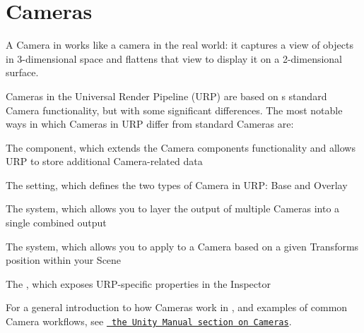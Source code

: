\chapter{Cameras}
\hypertarget{md__hey_tea_9_2_library_2_package_cache_2com_8unity_8render-pipelines_8universal_0d14_80_88_2_documentation_0i_2cameras}{}\label{md__hey_tea_9_2_library_2_package_cache_2com_8unity_8render-pipelines_8universal_0d14_80_88_2_documentation_0i_2cameras}
\label{md__hey_tea_9_2_library_2_package_cache_2com_8unity_8render-pipelines_8universal_0d14_80_88_2_documentation_0i_2cameras_autotoc_md2099}%
%
 A Camera in  works like a camera in the real world\+: it captures a view of objects in 3-\/dimensional space and flattens that view to display it on a 2-\/dimensional surface.

Cameras in the Universal Render Pipeline (URP) are based on \textquotesingle{}s standard Camera functionality, but with some significant differences. The most notable ways in which Cameras in URP differ from standard  Cameras are\+:


\begin{DoxyItemize}
\item The  component, which extends the Camera component\textquotesingle{}s functionality and allows URP to store additional Camera-\/related data
\item The  setting, which defines the two types of Camera in URP\+: Base and Overlay
\item The  system, which allows you to layer the output of multiple Cameras into a single combined output
\item The  system, which allows you to apply  to a Camera based on a given Transform\textquotesingle{}s position within your Scene
\item The , which exposes URP-\/specific properties in the Inspector
\end{DoxyItemize}

For a general introduction to how Cameras work in , and examples of common Camera workflows, see \href{https://docs.unity3d.com/Manual/CamerasOverview.html}{\texttt{ the Unity Manual section on Cameras}}. 
